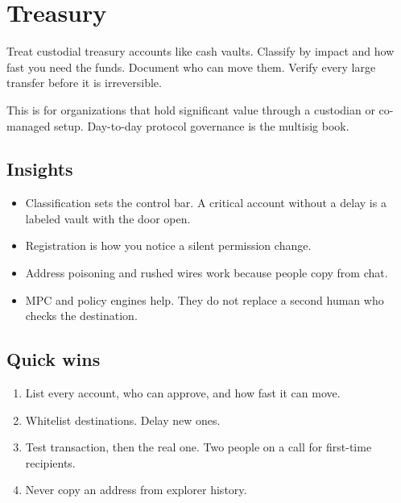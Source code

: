 \chapter{Treasury}

Treat custodial treasury accounts like cash vaults.
Classify by impact and how fast you need the funds.
Document who can move them. Verify every large transfer
before it is irreversible.

This is for organizations that hold significant value
through a custodian or co-managed setup. Day-to-day
protocol governance is the multisig book.

\section{Insights}

\begin{itemize}
  \item Classification sets the control bar. A critical
  account without a delay is a labeled vault with the
  door open.
  \item Registration is how you notice a silent
  permission change.
  \item Address poisoning and rushed wires work because
  people copy from chat.
  \item MPC and policy engines help. They do not replace
  a second human who checks the destination.
\end{itemize}

\section{Quick wins}

\begin{enumerate}
  \item List every account, who can approve, and how
  fast it can move.
  \item Whitelist destinations. Delay new ones.
  \item Test transaction, then the real one. Two people
  on a call for first-time recipients.
  \item Never copy an address from explorer history.
\end{enumerate}
